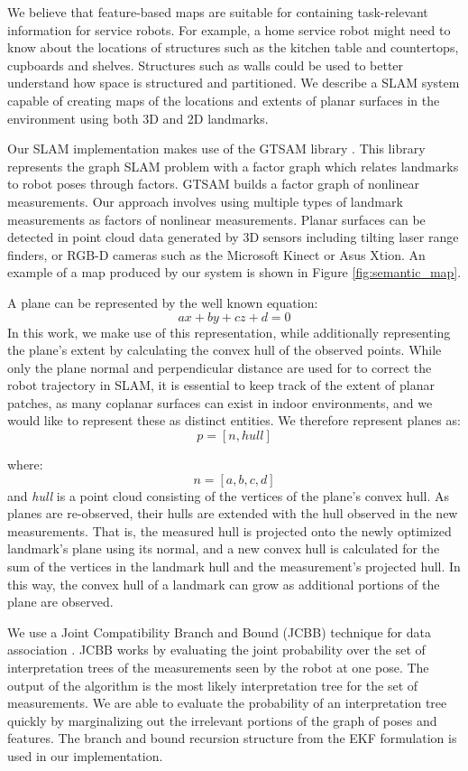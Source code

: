 \documentclass{tADR2e}
\begin{document}
We believe that feature-based maps are suitable for containing task-relevant information for service robots. For example, a home service robot might need to know
about the locations of structures such as the kitchen table and countertops, cupboards and shelves. Structures such as walls could be used to better understand how space is
structured and partitioned. We describe a SLAM system capable of creating maps of
the locations and extents of planar surfaces in the environment using both 3D and 2D landmarks.

Our SLAM implementation makes use of the GTSAM library \cite{dellaert2006square}. This library
represents the graph SLAM problem with a factor graph which relates landmarks to
robot poses through factors. GTSAM builds a factor graph of nonlinear measurements. Our approach involves using multiple types of landmark measurements as factors of nonlinear measurements. Planar surfaces can be detected in point cloud data generated by 3D sensors including tilting laser range finders, or RGB-D cameras such as the Microsoft Kinect or Asus Xtion. An example of a map produced
by our system is shown in Figure \ref{fig:semantic_map}.

A plane can be represented by the well known equation:
$$ax + by + cz + d = 0$$
In this work, we make use of this representation, while additionally representing
the plane’s extent by calculating the convex hull of the observed points. While only
the plane normal and perpendicular distance are used for to correct the robot trajectory in SLAM, it is essential to keep track of the extent of planar patches, as many
coplanar surfaces can exist in indoor environments, and we would like to represent
these as distinct entities. We therefore represent planes as:
$$p = [n, hull]$$ 

where:
$$n = [a, b, c, d]$$ and \textit{hull} is a point cloud consisting of the vertices of the plane’s convex hull. As
planes are re-observed, their hulls are extended with the hull observed in the new
measurements. That is, the measured hull is projected onto the newly optimized
landmark’s plane using its normal, and a new convex hull is calculated for the sum
of the vertices in the landmark hull and the measurement’s projected hull. In this
way, the convex hull of a landmark can grow as additional portions of the plane are
observed.

We use a Joint Compatibility Branch and Bound (JCBB) technique for data association \cite{neira2001data}. JCBB works by evaluating the joint
probability over the set of interpretation trees of the measurements seen by the robot
at one pose. The output of the algorithm is the most likely interpretation tree for
the set of measurements. We are able to evaluate the probability of an interpretation
tree quickly by marginalizing out the irrelevant portions of the graph of poses and features. The branch and bound recursion structure from the EKF formulation is
used in our implementation.
\end{document}
